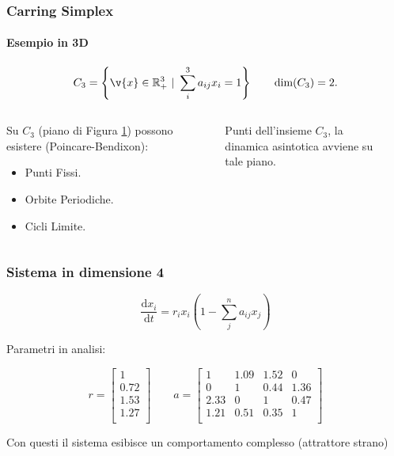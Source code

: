 \begin{frame}
\frametitle{Carring Simplex}
\framesubtitle{Esempio in 3D}
\[
    C_3 = \left\{\v{x}\in \mathbb{R}^3_+ \ | \ \sum_{i}^{3} a_{ij}x_i = 1\right\} \qquad
    \text{dim}(C_3) = 2
.\] 
\begin{columns}
\begin{column}{0.4\textwidth}
    Su $C_3$ (piano di Figura \ref{fig:C3}) possono esistere (Poincare-Bendixon):
\vspace{1em}
\begin{itemize}
    \item Punti Fissi.
    \item Orbite Periodiche.
    \item Cicli Limite.
\end{itemize}
\end{column}
\begin{column}{0.4\textwidth}
\begin{figure}[h]
    \centering
    \captionsetup{width=.8\linewidth}
    \def\svgwidth{0.8\columnwidth}
    
    \caption{\scriptsize Punti dell'insieme $C_3$, la dinamica asintotica avviene su tale piano.}
    \label{fig:C3}
\end{figure}
\end{column}
\end{columns}
\end{frame}

\begin{frame}
\frametitle{Sistema in dimensione 4}
\[
    \frac{\text{d} x_i}{\text{d} t} = r_ix_i\left(1-\sum_{j}^{n} a_{ij}x_j\right)
\] 
\begin{center}
    Parametri in analisi:
\end{center}
\[
    r =\begin{bmatrix}
        1 \\
        0.72 \\
        1.53 \\
        1.27 \\
    \end{bmatrix} \qquad 
    a =\begin{bmatrix}
        1 & 1.09 & 1.52 & 0 \\
        0 & 1 & 0.44 & 1.36 \\
        2.33 & 0 & 1 & 0.47 \\
        1.21 & 0.51 & 0.35 & 1 \\
    \end{bmatrix}
\] 
\begin{center}
    Con questi il sistema esibisce un comportamento complesso (attrattore strano)
\end{center}
\end{frame}

